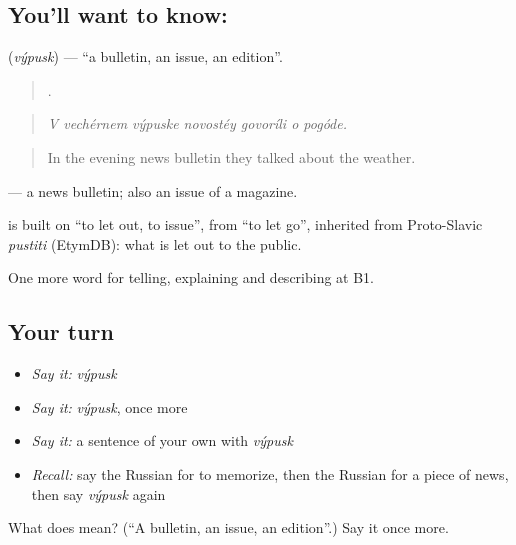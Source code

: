 \subsection*{You'll want to know: }
\textbf{} (\emph{výpusk}) — \textquotedblleft{}a bulletin, an issue, an edition\textquotedblright{}.

\begin{quote}
      .
\end{quote}

\begin{quote}
\emph{V vechérnem výpuske novostéy govoríli o pogóde.}
\end{quote}

\begin{quote}
In the evening news bulletin they talked about the weather.
\end{quote}

\emph{ } — a news bulletin; also an issue of a magazine.

\begin{cousinweb}
\emph{} is built on \emph{} \textquotedblleft{}to let out, to issue\textquotedblright{}, from \emph{} \textquotedblleft{}to let go\textquotedblright{}, inherited from Proto-Slavic \emph{pustiti} (EtymDB): what is let out to the public.
\end{cousinweb}

\begin{grammarlens}[title={What you've built}]
One more word for telling, explaining and describing at B1.
\end{grammarlens}

\subsection*{Your turn}
\begin{itemize}
\raggedright
  \item \emph{Say it:} \emph{výpusk}
  \item \emph{Say it:} \emph{výpusk}, once more
  \item \emph{Say it:} a sentence of your own with \emph{výpusk}
  \item \emph{Recall:} say the Russian for to memorize, then the Russian for a piece of news, then say \emph{výpusk} again
\end{itemize}

\begin{tcolorbox}[breakable,colback=teal!4,colframe=teal!35!black,title={Before you move on}]
What does  mean? (\textquotedblleft{}A bulletin, an issue, an edition\textquotedblright{}.) Say it once more.
\end{tcolorbox}
